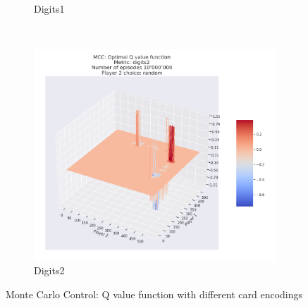 \begin{figure}[ht!]
\begin{subfigure}{0.5\textwidth}
        \caption[Digits1]{Digits1}
        \label{fig:mccdigits1}
    \end{subfigure} \\
    \begin{subfigure}{0.5\textwidth}
        \includegraphics[width=1\linewidth]{Figures/mcc_digits2_10000000_random}
        \caption[Digits2]{Digits2}
        \label{fig:mccdigits2}
    \end{subfigure}
    \caption{Monte Carlo Control: Q value function with different card encodings}
\label{fig:Monte Carlo Control: Q value function with different card encodings}
\end{figure}




